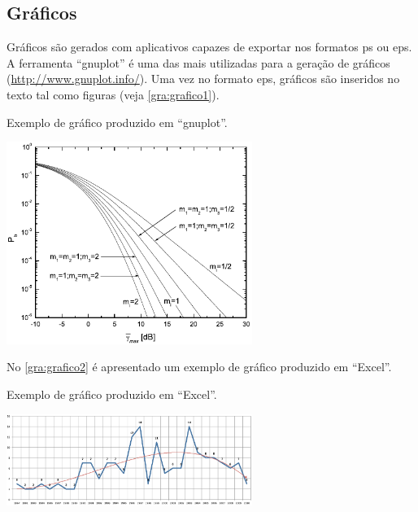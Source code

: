 \subsection{Gr\'aficos}\label{sec:graficos}

Gr\'aficos s\~ao gerados com aplicativos capazes de exportar nos formatos \gls{ps} ou \gls{eps}. A ferramenta ``gnuplot'' \'e uma das mais utilizadas para a gera\c{c}\~ao de gr\'aficos (\url{http://www.gnuplot.info/}). Uma vez no formato \gls{eps}, gr\'aficos s\~ao inseridos no texto tal como figuras (veja \autoref{gra:grafico1}).

\begin{graph}[Htb]%
\captionsetup{width=0.6\textwidth}%
\caption{Exemplo de gr\'afico produzido em ``gnuplot''.}%
\label{gra:grafico1}%
\includegraphics[width=0.6\textwidth]{./CapituloExemplo/grafico1}%
\end{graph}

No \autoref{gra:grafico2} \'e apresentado um exemplo de gr\'afico produzido em ``Excel''.

\begin{graph}[Htb]%
\captionsetup{width=0.6\textwidth}%
\caption{Exemplo de gr\'afico produzido em ``Excel''.}%
\label{gra:grafico2}%
\includegraphics[width=0.6\textwidth]{./CapituloExemplo/grafico2}%
\end{graph}

